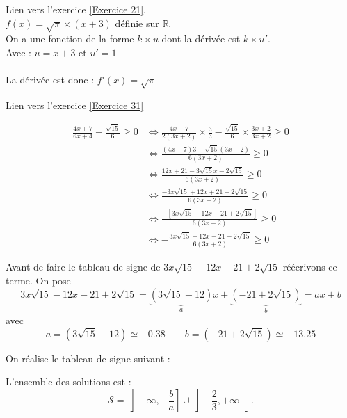 \documentclass[12pt,fleqn]{report} %
\begin{document}
\begin{correction}Lien vers l'exercice   \ref{Exercice 21}.\\
	$f(x)= \sqrt{\pi}\times(x+3)$ définie sur $\mathbb{R}$. \\
	On a une fonction de la forme $k\times u$ dont la dérivée est $k\times u'$. \\
	Avec : \qquad $u=x+3$ \qquad et $u'=1$ \\ \\
	La dérivée est donc : $f'(x)=\sqrt{\pi}$
	\begin{center}
	\end{center}
\end{correction}

\begin{correction}Lien vers l'exercice   \ref{Exercice 31}
	
	\begin{align*}
	\frac{4x+7}{6x+4}-\frac{\sqrt{15}}{6}\geq 0 & \iff \frac{4x+7}{2(3x+2)}\times\frac{3}{3}-\frac{\sqrt{15}}{6}\times\frac{3x+2}{3x+2}\geq 0	\\
	& \iff\frac{(4x+7)3-\sqrt{15}(3x+2)}{6(3x+2)}\geq0
	\\
	& \iff \frac{12x+21-3\sqrt{15}x-2\sqrt{15}}{6(3x+2)}\geq 0
	\\
	& \iff \frac{-3x\sqrt{15}+12x+21-2\sqrt{15}}{6(3x+2)}\geq 0
	\\
	& \iff\frac{-\left[3x\sqrt{15}-12x-21+2\sqrt{15}\right]}{6(3x+2)}\geq0
	\\
	& \iff-\frac{3x\sqrt{15}-12x-21+2\sqrt{15}}{6(3x+2)}\geq 0
	\end{align*}
	
	Avant de faire le tableau de signe de $3x\sqrt{15}-12x-21+2\sqrt{15}$ réécrivons ce terme. On pose \[
	3x\sqrt{15}-12x-21+2\sqrt{15} = \underbrace{\left(3\sqrt{15} - 12\right)}_{a} x + \underbrace{\left(-21 + 2\sqrt{15}\right)}_{b} = ax + b
	\]
	avec \[
	a = \left(3\sqrt{15} - 12\right) \simeq -0.38 \qquad b = \left(-21 + 2\sqrt{15}\right) \simeq -13.25
	\]
	
	On réalise le tableau de signe suivant :
	\begin{center}
	\end{center}
	
	L'ensemble des solutions est : 
	\[
	\mathcal{S} = \left]-\infty,  -\frac{b}{a} \right] \cup \left]-\frac{2}{3},  +\infty \right[.
	\]
\end{correction}
\end{document}
